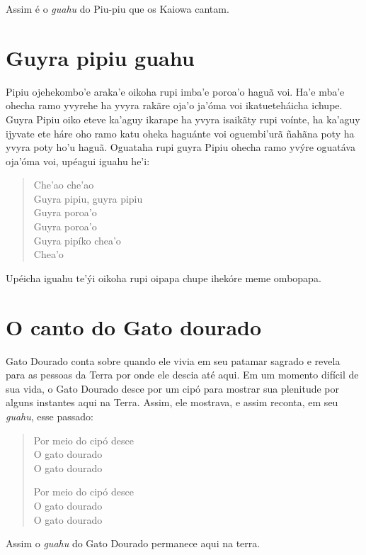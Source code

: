 Assim é o \textit{guahu} do Piu-piu que os Kaiowa cantam.

\chapter{Guyra pipiu guahu}

 Pipiu ojehekombo'e araka'e oikoha rupi imba'e poroa'o haguã voi.
Ha'e mba'e ohecha ramo yvyrehe ha yvyra rakãre oja'o ja'óma voi
ikatueteháicha ichupe. Guyra Pipiu oiko eteve ka'aguy ikarape ha yvyra
isaikãty rupi voínte, ha ka'aguy ijyvate ete háre oho ramo katu oheka
haguánte voi oguembi'urã ñahãna poty ha yvyra poty ho'u haguã. Oguataha
rupi guyra Pipiu ohecha ramo yvýre oguatáva oja'óma voi, upéagui iguahu
he'i:


\begin{verse}
Che'ao che'ao\\
Guyra pipiu, guyra pipiu\\
Guyra poroa'o\\
Guyra poroa'o\\
Guyra pipíko chea'o\\
Chea'o
\end{verse}

Upéicha iguahu te'ýi oikoha rupi oipapa chupe ihekóre meme ombopapa.


\chapter{O canto do Gato dourado}

 Gato Dourado conta sobre quando ele vivia em seu patamar sagrado e
revela para as pessoas da Terra por onde ele descia até aqui. Em um
momento difícil de sua vida, o Gato Dourado desce por um cipó para
mostrar sua plenitude por alguns instantes aqui na Terra. Assim, ele
mostrava, e assim reconta, em seu \textit{guahu}, esse passado:

\begin{verse}
Por meio do cipó desce\\
O gato dourado\footnotemark{}\\
O gato dourado

Por meio do cipó desce\\
O gato dourado\\
O gato dourado
\end{verse}

Assim o \textit{guahu} do Gato Dourado permanece aqui na terra.


